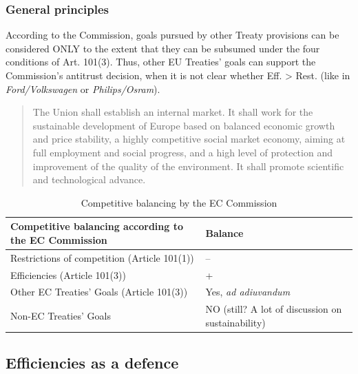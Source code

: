 
        \subsubsection{General principles}

            According to the Commission, goals pursued by other Treaty provisions can be considered ONLY to the extent that they can be subsumed under the four conditions of Art. 101(3). Thus, other EU Treaties’ goals can support the Commission’s antitrust decision, when it is not clear whether Eff. > Rest. (like in \textit{Ford/Volkswagen} or \textit{Philips/Osram}).

            \begin{quote}
                The Union shall establish an internal market. It shall work for the sustainable development of Europe based on balanced economic growth and price stability, a highly competitive social market economy, aiming at full employment and social progress, and a high level of protection and improvement of the quality of the environment. It shall promote scientific and technological advance.
            \end{quote}

            \begin{table}[h!]
            \centering
            \begin{tabular}{|>{\raggedright\arraybackslash}m{6cm}|>{\centering\arraybackslash}m{3cm}|}
            \hline
            \textbf{Competitive balancing according to the EC Commission} & \textbf{Balance} \\ \hline
            Restrictions of competition (Article 101(1)) & -- \\ \hline
            Efficiencies (Article 101(3)) & + \\ \hline
            Other EC Treaties' Goals (Article 101(3)) & Yes, \textit{ad adiuvandum} \\ \hline
            Non-EC Treaties' Goals & NO (still? A lot of discussion on sustainability) \\ \hline
            \end{tabular}
            \caption{Competitive balancing by the EC Commission}
            \end{table}

    \subsection{Efficiencies as a defence}

